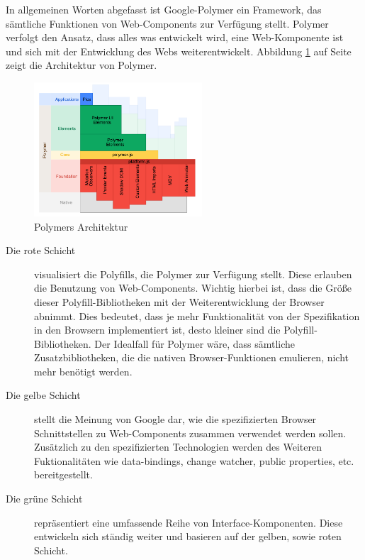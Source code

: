 
In allgemeinen Worten abgefasst ist Google-Polymer ein Framework, das sämtliche Funktionen von Web-Components zur Verfügung stellt. Polymer verfolgt den Ansatz, dass alles was entwickelt wird, eine Web-Komponente ist und sich mit der Entwicklung des Webs weiterentwickelt. Abbildung \ref{fig:3_polymer_architecture} auf Seite \pageref{fig:3_polymer_architecture} zeigt die Architektur von Polymer.


\begin{figure}[h]
\centering
\includegraphics[height=5.0cm]{images/polymer_architecture.png}
\caption[
Polymers Architektur, Urldate: 04.2014 \newline
\small\texttt{\url{http://www.polymer-project.org/images/architecture-diagram.svg}}
]{Polymers Architektur}
\label{fig:3_polymer_architecture}
\end{figure}

\begin{description}
\item[Die rote Schicht] visualisiert die Polyfills, die Polymer zur Verfügung stellt. Diese erlauben die Benutzung von Web-Components. Wichtig hierbei ist, dass die Größe dieser Polyfill-Bibliotheken mit der Weiterentwicklung der Browser abnimmt. Dies bedeutet, dass je mehr Funktionalität von der Spezifikation in den Browsern implementiert ist, desto kleiner sind die Polyfill-Bibliotheken. Der Idealfall für Polymer wäre, dass sämtliche Zusatzbibliotheken, die die nativen Browser-Funktionen emulieren, nicht mehr benötigt werden.
\item[Die gelbe Schicht] stellt die Meinung von Google dar, wie die spezifizierten Browser Schnittstellen zu Web-Components zusammen verwendet werden sollen. Zusätzlich zu den spezifizierten Technologien werden des Weiteren Fuktionalitäten wie \glqq data-bindings\grqq , \glqq change watcher\grqq , \glqq public properties\grqq , etc. bereitgestellt.
\item[Die grüne Schicht] repräsentiert eine umfassende Reihe von Interface-Komponenten. Diese entwickeln sich ständig weiter und basieren auf der gelben, sowie roten Schicht.
\end{description}

